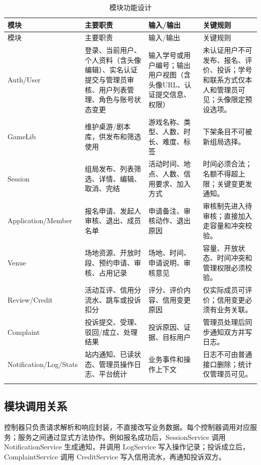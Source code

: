 \documentclass[a4paper]{article}
\begin{document}
\begin{longtable}{P{3.0cm} P{4.2cm} P{4.0cm} P{4.0cm}}
  \toprule
  模块 & 主要职责 & 输入/输出 & 关键规则 \\
  \midrule
  \endfirsthead
  \toprule
  模块 & 主要职责 & 输入/输出 & 关键规则 \\
  \midrule
  \endhead
  Auth/User & 登录、当前用户、个人资料（含头像编辑）、实名认证提交与管理员审核、用户列表管理、角色与账号状态变更 & 输入学号或用户编号；输出用户视图（含头像URL、认证提交信息、权限） & 未认证用户不可发布、报名、评价、投诉；学号和联系方式仅本人和管理员可见；头像限定预设选项。 \\
  GameLib & 维护桌游/剧本库，供发布和筛选使用 & 游戏名称、类型、人数、时长、难度、标签 & 下架条目不可被新组局选择。 \\
  Session & 组局发布、列表筛选、详情、编辑、取消、完结 & 活动时间、地点、人数、信用要求、加入方式 & 时间必须合法；名额不得超上限；关键变更发通知。 \\
  Application/Member & 报名申请、发起人审核、退出、成员名单 & 申请备注、审核动作、退出原因 & 审核制先进入待审核；直接加入走容量和冲突校验。 \\
  Venue & 场地资源、开放时段、预约申请、审核、占用记录 & 场地、时间、申请说明、审核意见 & 容量、开放状态、时间冲突和管理权限必须校验。 \\
  Review/Credit & 活动互评、信用分流水、跳车或投诉扣分 & 评分、评价内容、信用变更原因 & 仅实际成员可评价；信用变更必须有业务关联。 \\
  Complaint & 投诉提交、受理、驳回/成立、处理结果 & 投诉原因、证据、目标用户 & 管理员处理后同步通知双方并写日志。 \\
  Notification/Log/Stats & 站内通知、已读状态、管理员操作日志、平台统计 & 业务事件和操作上下文 & 日志不可由普通接口删除；统计仅管理员可见。 \\
  \bottomrule
  \caption{模块功能设计}
\end{longtable}

\subsection{模块调用关系}

控制器只负责请求解析和响应封装，不直接改写业务数据。每个控制器调用对应服务；服务之间通过显式方法协作。例如报名成功后，SessionService 调用 NotificationService 生成通知，并调用 LogService 写入操作记录；投诉成立后，ComplaintService 调用 CreditService 写入信用流水，再通知投诉双方。
\end{document}
